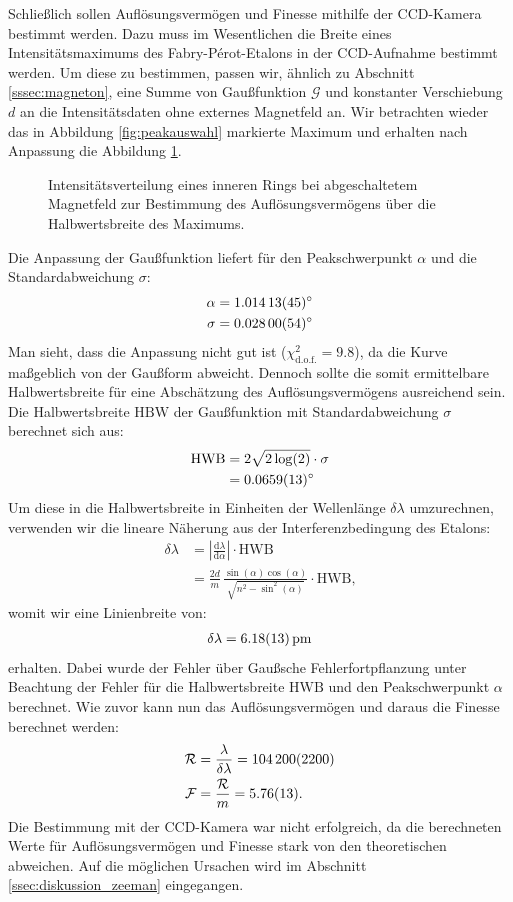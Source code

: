 \documentclass[11pt, a4paper]{article}
\begin{document}
Schließlich sollen Auflösungsvermögen und Finesse mithilfe der CCD-Kamera bestimmt werden.
Dazu muss im Wesentlichen die Breite eines Intensitätsmaximums des Fabry-Pérot-Etalons in der CCD-Aufnahme bestimmt werden.
Um diese zu bestimmen, passen wir, ähnlich zu Abschnitt \ref{sssec:magneton}, eine Summe von Gaußfunktion $\mathcal{G}$ und konstanter Verschiebung $d$ an die Intensitätsdaten ohne externes Magnetfeld an.
Wir betrachten wieder das in Abbildung \ref{fig:peakauswahl} markierte Maximum und erhalten nach Anpassung die Abbildung \ref{fig:gauss0}.
\begin{figure}[h]
	\centering
	
	\caption{Intensitätsverteilung eines inneren Rings bei abgeschaltetem Magnetfeld zur Bestimmung des Auflösungsvermögens über die Halbwertsbreite des Maximums.}
	\label{fig:gauss0}
\end{figure}
Die Anpassung der Gaußfunktion liefert für den Peakschwerpunkt $\alpha$ und die Standardabweichung $\sigma$:
\begin{align*}
	\alpha &= \SI{1.01413 +- 0.00045}{\degree}\\
	\sigma &= \SI{0.02800 +- 0.00054}{\degree}
\end{align*}
Man sieht, dass die Anpassung nicht gut ist ($\chi^2_\mathrm{d.o.f.} = 9.8$), da die Kurve maßgeblich von der Gaußform abweicht.
Dennoch sollte die somit ermittelbare Halbwertsbreite für eine Abschätzung des Auflösungsvermögens ausreichend sein.
Die Halbwertsbreite $\mathrm{HBW}$ der Gaußfunktion mit Standardabweichung $\sigma$ berechnet sich aus:
\begin{align*}
\mathrm{HWB} &= 2 \sqrt{2\log(2)} \cdot \sigma\\
 &= \SI{0.0659 +- 0.0013}{\degree}
\end{align*}
Um diese in die Halbwertsbreite in Einheiten der Wellenlänge $\delta \lambda$ umzurechnen, verwenden wir die lineare Näherung aus der Interferenzbedingung des Etalons:
\begin{align*}
	\delta \lambda &= \left| \frac{\mathrm{d}\lambda}{\mathrm{d}\alpha} \right| \cdot \mathrm{HWB} \\
	 &= \frac{2d}{m} \, \frac{\sin(\alpha) \cos(\alpha)}{\sqrt{n^2-\sin^2(\alpha)}} \cdot \mathrm{HWB}\text{,}
\end{align*}
womit wir eine Linienbreite von:
\begin{align*}
	\delta \lambda = \SI{6.18 +- 0.13}{\pico\metre}
\end{align*}
erhalten.
Dabei wurde der Fehler über Gaußsche Fehlerfortpflanzung unter Beachtung der Fehler für die Halbwertsbreite $\mathrm{HWB}$ und den Peakschwerpunkt $\alpha$ berechnet.
Wie zuvor kann nun das Auflösungsvermögen und daraus die Finesse berechnet werden:
\begin{align*}
	\mathcal{R} &= \frac{\lambda}{\delta \lambda} = \num{104200 +- 2200} \\
	\mathcal{F} &= \frac{\mathcal{R}}{m} = \num{5.76 +- 0.13}\text{.}
\end{align*}
Die Bestimmung mit der CCD-Kamera war nicht erfolgreich, da die berechneten Werte für Auflösungsvermögen und Finesse stark von den theoretischen abweichen.
Auf die möglichen Ursachen wird im Abschnitt \ref{ssec:diskussion_zeeman} eingegangen.
\end{document}
